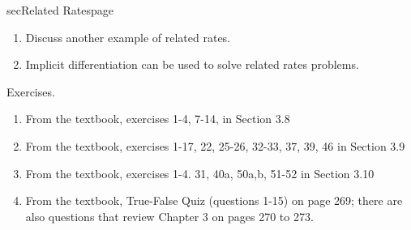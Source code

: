 \documentclass[../main]{subfiles}
\begin{document}
\begin{outline}{sec}{Related Rates}{page}
\begin{enumerate}
    \item Discuss another example of related rates. 
    \item {Implicit differentiation can be used to solve related rates problems.}
\end{enumerate}
\end{outline}



%
%
Exercises.
\begin{enumerate}
    \item From the textbook, exercises 1-4, 7-14,  in Section 3.8 %
    \item From the textbook, exercises 1-17, 22, 25-26, 32-33, 37, 39, 46 in Section 3.9
    \item From the textbook, exercises  1-4. 31, 40a, 50a,b, 51-52 in Section 3.10 %
    \item From the textbook, True-False Quiz (questions 1-15) on page 269; there are also questions that review
Chapter 3 on pages 270 to 273.
\end{enumerate}
\end{document}
